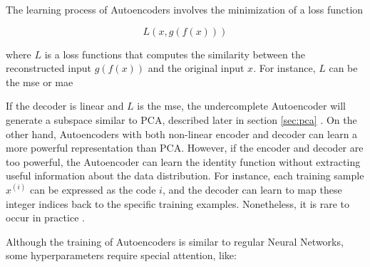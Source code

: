The learning process of Autoencoders involves the minimization of a loss function 

\begin{equation}
L(x, g(f(x)))
\end{equation}

\noindent
where $L$ is a loss functions that computes the similarity between the reconstructed input $g(f(x))$ and the original input $x$. For instance, $L$ can be the \acf{mse} or \acf{mae}

If the decoder is linear and $L$ is the \acs{mse}, the undercomplete Autoencoder will generate a subspace similar to PCA, described later in section \ref{sec:pca} \citep{lecun2015deep}. On the other hand, Autoencoders with both non-linear encoder and decoder can learn a more powerful representation than PCA. However, if the encoder and decoder are too powerful, the Autoencoder can learn the identity function without extracting useful information about the data distribution. For instance, each training sample $x^{(i)}$ can be expressed as the code $i$, and the decoder can learn to map these integer indices back to the specific training examples. Nonetheless, it is rare to occur in practice \citep{lecun2015deep}.

Although the training of Autoencoders is similar to regular Neural Networks, some hyperparameters require special attention, like:

